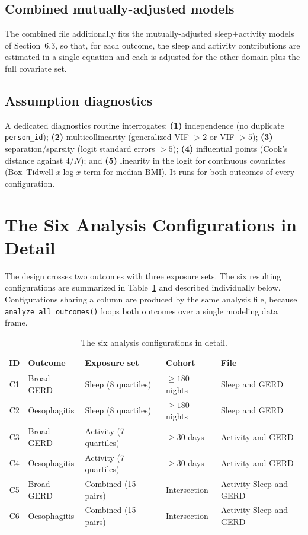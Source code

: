 \documentclass[11pt]{article}
\newcommand{\code}[1]{\texttt{\small #1}}
\begin{document}
\subsection{Combined mutually-adjusted models}
The combined file additionally fits the mutually-adjusted sleep$+$activity models of
Section~6.3, so that, for each outcome, the sleep and activity contributions are estimated in a single
equation and each is adjusted for the other domain plus the full covariate set.

\subsection{Assumption diagnostics}
A dedicated diagnostics routine interrogates: \textbf{(1)} independence (no duplicate
\code{person_id}); \textbf{(2)} multicollinearity (generalized VIF $>2$ or VIF $>5$); \textbf{(3)}
separation/sparsity (logit standard errors $>5$); \textbf{(4)} influential points (Cook's distance
against $4/N$); and \textbf{(5)} linearity in the logit for continuous covariates (Box--Tidwell $x\log
x$ term for median BMI). It runs for both outcomes of every configuration.


\section{The Six Analysis Configurations in Detail}\label{sec:six-configs-ref}
The design crosses two outcomes with three exposure sets. The six resulting configurations are
summarized in Table~\ref{tab:sixdetail} and described individually below. Configurations sharing a
column are produced by the same analysis file, because \code{analyze_all_outcomes()} loops both
outcomes over a single modeling data frame.

\begin{table}[h]
\centering
\footnotesize
\begin{tabular}{@{}c p{2.7cm} p{2.9cm} p{2.4cm} p{3.0cm}@{}}
\toprule
\textbf{ID} & \textbf{Outcome} & \textbf{Exposure set} & \textbf{Cohort} & \textbf{File} \\
\midrule
C1 & Broad GERD & Sleep (8 quartiles) & $\geq 180$ nights & Sleep and GERD \\
C2 & Oesophagitis & Sleep (8 quartiles) & $\geq 180$ nights & Sleep and GERD \\
C3 & Broad GERD & Activity (7 quartiles) & $\geq 30$ days & Activity and GERD \\
C4 & Oesophagitis & Activity (7 quartiles) & $\geq 30$ days & Activity and GERD \\
C5 & Broad GERD & Combined (15 + pairs) & Intersection & Activity Sleep and GERD \\
C6 & Oesophagitis & Combined (15 + pairs) & Intersection & Activity Sleep and GERD \\
\bottomrule
\end{tabular}
\caption{The six analysis configurations in detail.}
\label{tab:sixdetail}
\end{table}
\end{document}
